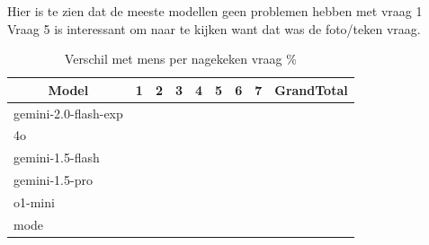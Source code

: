 \documentclass[12pt]{article}
\begin{document}
\noindent\begin{table}[H]
\caption{Verschil met mens per nagekeken vraag \%}
Hier is te zien dat de meeste modellen geen problemen hebben met vraag 1\\
Vraag 5 is interessant om naar te kijken want dat was de foto/teken vraag.
\begin{tabularx}{\textwidth}{X rrrrrrrr}
    \toprule
    \multicolumn{1}{c}{\textbf{Model}} & \multicolumn{1}{c}{\textbf{1}} & \multicolumn{1}{c}{\textbf{2}} & \multicolumn{1}{c}{\textbf{3}} & \multicolumn{1}{c}{\textbf{4}} & \multicolumn{1}{c}{\textbf{5}} & \multicolumn{1}{c}{\textbf{6}} & \multicolumn{1}{c}{\textbf{7}} & \multicolumn{1}{c}{\textbf{GrandTotal}} \\
    \midrule
    gemini-2.0-flash-exp & \cellcolor[rgb]{0.275,0.514,0.275}{0.00} & \cellcolor[rgb]{0.442,0.626,0.442}{4.44} & \cellcolor[rgb]{0.881,0.921,0.881}{16.09} & \cellcolor[rgb]{0.543,0.693,0.543}{7.11} & \cellcolor[rgb]{0.543,0.694,0.543}{7.12} & \cellcolor[rgb]{0.450,0.631,0.450}{4.65} & \cellcolor[rgb]{0.639,0.758,0.639}{9.67} & \cellcolor[rgb]{0.565,0.708,0.565}{7.69} \\
    4o & \cellcolor[rgb]{0.439,0.624,0.439}{4.35} & \cellcolor[rgb]{0.360,0.571,0.360}{2.27} & \cellcolor[rgb]{0.510,0.671,0.510}{6.23} & \cellcolor[rgb]{0.683,0.787,0.683}{10.82} & \cellcolor[rgb]{0.458,0.637,0.458}{4.87} & \cellcolor[rgb]{0.608,0.737,0.608}{8.83} & \cellcolor[rgb]{0.717,0.810,0.717}{11.74} & \cellcolor[rgb]{0.554,0.701,0.554}{7.41} \\
    gemini-1.5-flash & \cellcolor[rgb]{0.439,0.624,0.439}{4.35} & \cellcolor[rgb]{0.275,0.514,0.275}{0.00} & \cellcolor[rgb]{0.772,0.847,0.772}{13.19} & \cellcolor[rgb]{0.880,0.920,0.880}{16.06} & \cellcolor[rgb]{0.623,0.747,0.623}{9.23} & \cellcolor[rgb]{0.450,0.631,0.450}{4.65} & \cellcolor[rgb]{0.975,0.983,0.975}{18.56} & \cellcolor[rgb]{0.675,0.782,0.675}{10.63} \\
    gemini-1.5-pro & \cellcolor[rgb]{0.439,0.624,0.439}{4.35} & \cellcolor[rgb]{0.360,0.571,0.360}{2.27} & \cellcolor[rgb]{0.931,0.953,0.931}{17.39} & \cellcolor[rgb]{0.767,0.844,0.767}{13.05} & \cellcolor[rgb]{0.623,0.747,0.623}{9.23} & \cellcolor[rgb]{0.608,0.737,0.608}{8.83} & \cellcolor[rgb]{0.918,0.945,0.918}{17.07} & \cellcolor[rgb]{0.694,0.795,0.694}{11.13} \\
    o1-mini & \cellcolor[rgb]{0.275,0.514,0.275}{0.00} & \cellcolor[rgb]{0.903,0.935,0.903}{16.65} & \cellcolor[rgb]{0.829,0.885,0.829}{14.69} & \cellcolor[rgb]{0.387,0.589,0.387}{2.98} & \cellcolor[rgb]{1.000,1.000,1.000}{19.23} & \cellcolor[rgb]{0.450,0.631,0.450}{4.65} & \cellcolor[rgb]{0.556,0.703,0.556}{7.47} & \cellcolor[rgb]{0.656,0.769,0.656}{10.11} \\
    mode & \cellcolor[rgb]{0.439,0.624,0.439}{4.35} & \cellcolor[rgb]{0.275,0.514,0.275}{0.00} & \cellcolor[rgb]{0.435,0.621,0.435}{4.25} & \cellcolor[rgb]{0.683,0.787,0.683}{10.82} & \cellcolor[rgb]{0.623,0.747,0.623}{9.23} & \cellcolor[rgb]{0.531,0.686,0.531}{6.79} & \cellcolor[rgb]{0.790,0.859,0.790}{13.66} & \cellcolor[rgb]{0.554,0.701,0.554}{7.41} \\
    \bottomrule
\end{tabularx}
\end{table}
\end{document}
